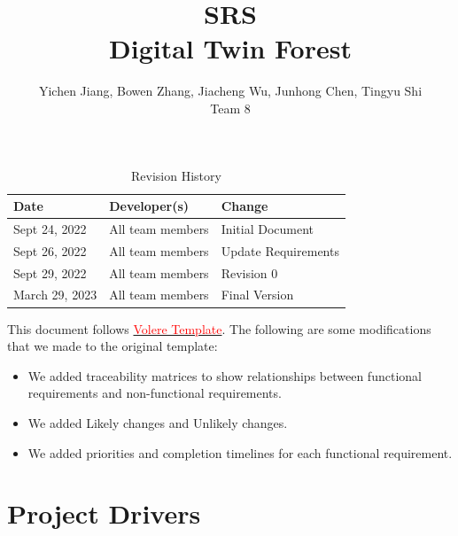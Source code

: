 \documentclass{article}
\title{SRS\\Digital Twin Forest}
\author{Yichen Jiang, Bowen Zhang, Jiacheng Wu, Junhong Chen, Tingyu Shi\\Team 8}
\begin{document}
\maketitle
\newpage
\begin{table}[htp]
\caption{Revision History} 
\begin{tabularx}{\textwidth}{llX}
\toprule
\textbf{Date} & \textbf{Developer(s)} & \textbf{Change}\\
\midrule
Sept 24, 2022 & All team members & Initial Document\\
\hline
Sept 26, 2022 & All team members & Update Requirements\\
\hline
Sept 29, 2022 & All team members & Revision 0\\
\hline
March 29, 2023 & All team members & Final Version\\
\bottomrule
\end{tabularx}
\end{table}

\vspace{5cm}

\noindent This document follows \href{https://www.cs.uic.edu/~i440/VolereMaterials/templateArchive16/c\%20Volere\%20template16.pdf}{\textcolor{red}{Volere Template}}.
The following are some modifications that we made to the 
original template:
\begin{itemize}
    \item We added traceability matrices to show relationships between
    functional requirements and non-functional requirements.
    \item We added Likely changes and Unlikely changes.
    \item We added priorities and 
    completion timelines for each functional requirement.
\end{itemize}


\newpage

\tableofcontents
\listoftables
\listoffigures
\cleardoublepage

\section{Project Drivers}
\end{document}
